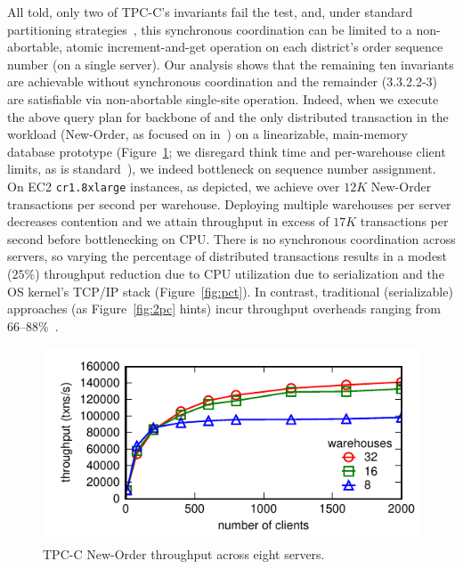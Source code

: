 All told, only two of TPC-C's invariants fail the \iconfluence test,
and, under standard partitioning strategies~\cite{calvin,schism}, this
synchronous coordination can be limited to a non-abortable, atomic
increment-and-get operation on each district's order sequence number
(on a single server). Our \cfreedom analysis shows that the remaining
ten invariants are achievable without synchronous coordination and the
remainder (3.3.2.2-3) are satisfiable via non-abortable single-site
operation. Indeed, when we execute the above query plan for backbone
of and the only distributed transaction in the workload (New-Order, as
focused on in~\cite{calvin}) on a linearizable, main-memory database
prototype (Figure~\ref{fig:clients}; we disregard think time and
per-warehouse client limits, as is
standard~\cite{calvin,hstore,abadi-vll,jones-dtxn}), we indeed
bottleneck on sequence number assignment. On EC2 \texttt{cr1.8xlarge}
instances, as depicted, we achieve over $12K$ New-Order transactions
per second per warehouse. Deploying multiple warehouses per server
decreases contention and we attain throughput in excess of $17K$
transactions per second before bottlenecking on CPU. There is no
synchronous coordination across servers, so varying the percentage of
distributed transactions results in a modest ($25\%$) throughput
reduction due to CPU utilization due to serialization and the OS
kernel's TCP/IP stack (Figure~\ref{fig:pct}). In contrast, traditional
(serializable) approaches (as Figure~\ref{fig:2pc} hints) incur
throughput overheads ranging from 66--88\%~\cite{abadi-vll}.

\begin{figure}
\includegraphics[width=\columnwidth]{figs/wh_thru.pdf}\vspace{-1em}
\caption{TPC-C New-Order throughput across eight servers.}
\label{fig:clients}
\end{figure}

